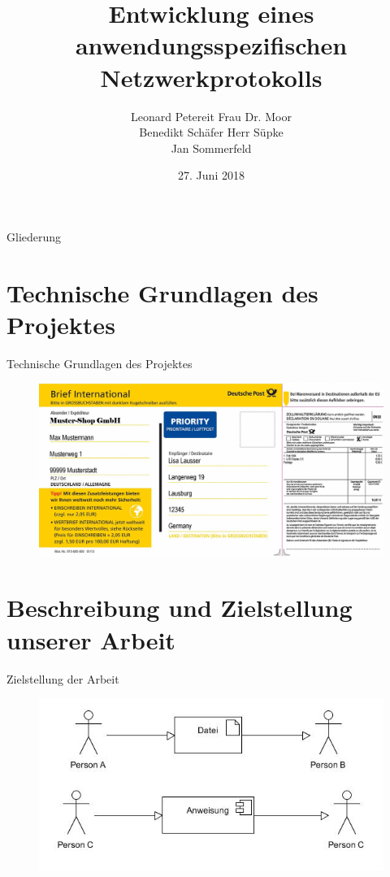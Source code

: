 \documentclass{beamer}
\title[]{Entwicklung eines anwendungsspezifischen Netzwerkprotokolls}
\author{Leonard Petereit\hfill \hspace{0.5cm} Frau Dr. Moor\\ Benedikt Schäfer\hfill \hspace{1cm} Herr Süpke \\ Jan Sommerfeld \hspace{4.25cm} }
\institute{Albert-Schweitzer Gymnasium Erfurt - Spezialschulteil}
\date{27. Juni 2018}
\begin{document}
\begin{frame}
	
  \titlepage
\end{frame}

\begin{frame}{Gliederung}

  \tableofcontents
\end{frame}



\section{Technische Grundlagen des Projektes}

\begin{frame}{Technische Grundlagen des Projektes}
\begin{figure}
\includegraphics{brief_international.jpg}
\end{figure}
\end{frame}

\section{Beschreibung und Zielstellung unserer Arbeit}

\begin{frame}{Zielstellung der Arbeit}
\begin{figure}
\includegraphics[width=\textwidth]{anw.jpg}
\end{figure}
\end{frame}
\end{document}

